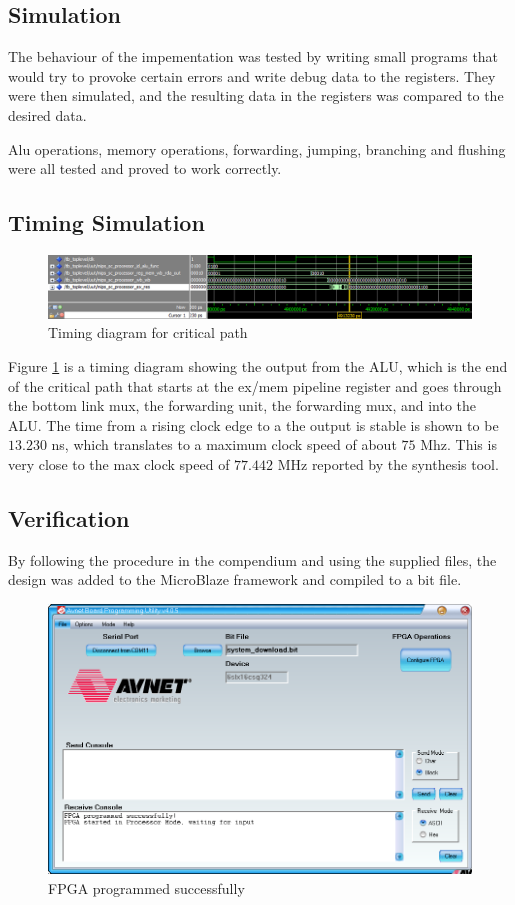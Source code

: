 \subsection{Simulation}

The behaviour of the impementation was tested by writing small programs that would try to provoke certain errors and write debug data to the registers. They were then simulated, and the resulting data in the registers was compared to the desired data.

Alu operations, memory operations, forwarding, jumping, branching and flushing were all tested and proved to work correctly.



\subsection{Timing Simulation}

\begin{figure}[ht]
    \centering
    \includegraphics[scale=0.5]{figures/TimingSimulation.png}
    \caption{Timing diagram for critical path} 
    \label{fig:timing}
\end{figure}

Figure \ref{fig:timing} is a timing diagram showing the output from the ALU, which is the end of the critical path that starts at the ex/mem pipeline register and goes through the bottom link mux, the forwarding unit, the forwarding mux, and into the ALU.
The time from a rising clock edge to a the output is stable is shown to be $13.230$ ns, which translates to a maximum clock speed of about $75$ Mhz.
This is very close to the max clock speed of $77.442$ MHz reported by the synthesis tool.

\subsection{Verification}

By following the procedure in the compendium \cite[p.47]{lab-compendium} and using the supplied files, the design was added to the MicroBlaze framework and compiled to a bit file.


\begin{figure}[ht]
    \centering
    \includegraphics[scale=0.5]{figures/AVNET.png}
    \caption{FPGA programmed successfully} 
    \label{fig:avprog}
\end{figure}



